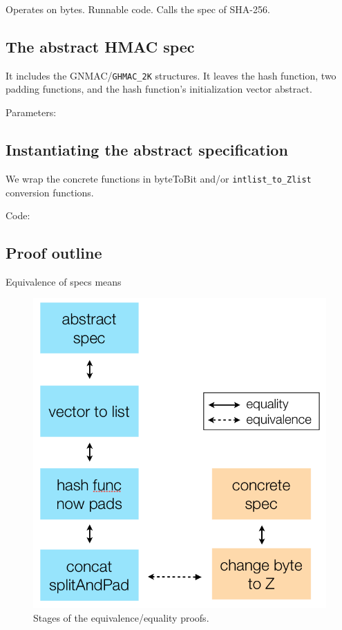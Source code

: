 \documentclass[twocolumn,showpacs,%
  nofootinbib,aps,superscriptaddress,%
  eqsecnum,prd,notitlepage,showkeys,10pt]{revtex4-1}
\begin{document}
Operates on bytes. Runnable code. Calls the spec of SHA-256.

\subsection{The abstract HMAC spec}

It includes the GNMAC/\verb|GHMAC_2K| structures. It leaves the hash function, two padding functions, and the hash function's initialization vector abstract.

Parameters:

\subsection{Instantiating the abstract specification}

We wrap the concrete functions in byteToBit and/or \verb|intlist_to_Zlist| conversion functions. 

Code:

\subsection{Proof outline}

Equivalence of specs means 

\begin{figure}[h!]
	\centering
	\includegraphics[scale=0.56]{Equivalence_proof_chain}
	\caption{Stages of the equivalence/equality proofs.}
\end{figure}
\end{document}
